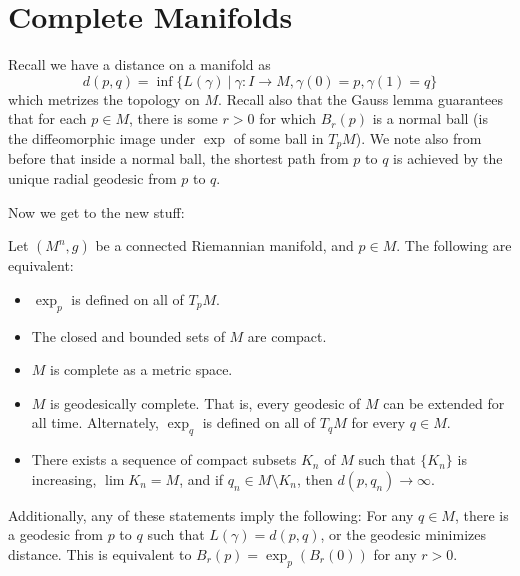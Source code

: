 \documentclass[../main.tex]{subfiles}
\begin{document}
\section{Complete Manifolds}

Recall we have a distance on a manifold as
\[
    d(p,q) = \inf \{L(\gamma)\ |\ \gamma:I\to M, \gamma(0)=p,\gamma(1)=q\}
\]
which metrizes the topology on $M$. Recall also that the Gauss lemma guarantees
that for each $p\in M$, there is some $r>0$ for which $B_r(p)$ is a normal ball
(is the diffeomorphic image under $\exp$ of some ball in $T_pM$). We note also
from before that inside a normal ball, the shortest path from $p$ to $q$ is
achieved by the unique radial geodesic from $p$ to $q$.

Now we get to the new stuff:

\begin{theorem}
    Let $(M^n,g)$ be a connected Riemannian manifold, and $p\in M$. The
    following are equivalent:
    \begin{itemize}
        \item $\exp_p$ is defined on all of $T_pM$.
        \item The closed and bounded sets of $M$ are compact.
        \item $M$ is complete as a metric space.
        \item $M$ is geodesically complete. That is, every geodesic of $M$ can
            be extended for all time. Alternately, $\exp_q$ is defined on all of
            $T_qM$ for every $q\in M$.
        \item There exists a sequence of compact subsets $K_n$ of $M$ such that
            $\{K_n\}$ is increasing, $\lim K_n = M$, and if $q_n\in M\setminus
            K_n$, then $d(p,q_n)\to\infty$.
    \end{itemize}
    Additionally, any of these statements imply the following: For any $q\in M$,
    there is a geodesic from $p$ to $q$ such that $L(\gamma) = d(p,q)$, or the
    geodesic minimizes distance. This is equivalent to $B_r(p) = \exp_p(B_r(0))$
    for any $r>0$.
    \label{Hopf-Rinnow Theorem}
\end{theorem}
\end{document}
